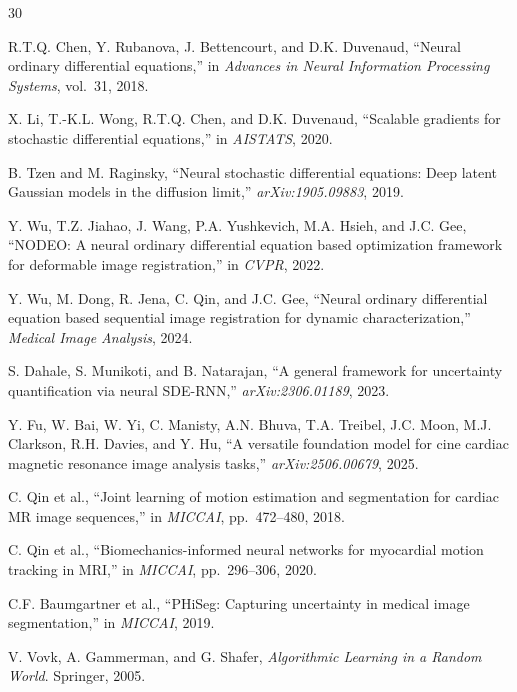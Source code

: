 \documentclass[10pt,twocolumn]{article}
\begin{document}
\begin{thebibliography}{30}

R.T.Q. Chen, Y. Rubanova, J. Bettencourt, and D.K. Duvenaud, ``Neural ordinary differential equations,'' in \emph{Advances in Neural Information Processing Systems}, vol.~31, 2018.

X. Li, T.-K.L. Wong, R.T.Q. Chen, and D.K. Duvenaud, ``Scalable gradients for stochastic differential equations,'' in \emph{AISTATS}, 2020.

B. Tzen and M. Raginsky, ``Neural stochastic differential equations: Deep latent Gaussian models in the diffusion limit,'' \emph{arXiv:1905.09883}, 2019.

Y. Wu, T.Z. Jiahao, J. Wang, P.A. Yushkevich, M.A. Hsieh, and J.C. Gee, ``NODEO: A neural ordinary differential equation based optimization framework for deformable image registration,'' in \emph{CVPR}, 2022.

Y. Wu, M. Dong, R. Jena, C. Qin, and J.C. Gee, ``Neural ordinary differential equation based sequential image registration for dynamic characterization,'' \emph{Medical Image Analysis}, 2024.

S. Dahale, S. Munikoti, and B. Natarajan, ``A general framework for uncertainty quantification via neural SDE-RNN,'' \emph{arXiv:2306.01189}, 2023.

Y. Fu, W. Bai, W. Yi, C. Manisty, A.N. Bhuva, T.A. Treibel, J.C. Moon, M.J. Clarkson, R.H. Davies, and Y. Hu, ``A versatile foundation model for cine cardiac magnetic resonance image analysis tasks,'' \emph{arXiv:2506.00679}, 2025.

C. Qin et al., ``Joint learning of motion estimation and segmentation for cardiac MR image sequences,'' in \emph{MICCAI}, pp.~472--480, 2018.

C. Qin et al., ``Biomechanics-informed neural networks for myocardial motion tracking in MRI,'' in \emph{MICCAI}, pp.~296--306, 2020.

C.F. Baumgartner et al., ``PHiSeg: Capturing uncertainty in medical image segmentation,'' in \emph{MICCAI}, 2019.

V. Vovk, A. Gammerman, and G. Shafer, \emph{Algorithmic Learning in a Random World}. Springer, 2005.


\end{thebibliography}
\end{document}

